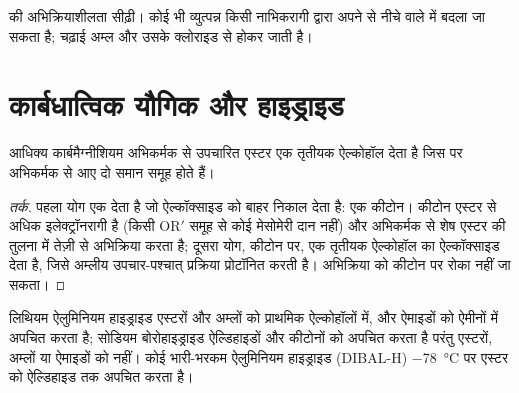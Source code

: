 \begin{omfigure}

{\small {} की अभिक्रियाशीलता सीढ़ी। कोई भी व्युत्पन्न किसी नाभिकरागी द्वारा
अपने से नीचे वाले में बदला जा सकता है; चढ़ाई अम्ल और उसके क्लोराइड से होकर जाती है।}
\end{omfigure}

\section{कार्बधात्विक यौगिक और हाइड्राइड}

\begin{proposition}[दो ग्रीन्यार योग]\label{prop:b2:acyl-substitution:grignard-ester}
आधिक्य कार्बमैग्नीशियम अभिकर्मक से उपचारित एस्टर एक तृतीयक ऐल्कोहॉल देता है जिस पर अभिकर्मक से आए
दो समान समूह होते हैं।
\end{proposition}

\begin{proof}[तर्क]
पहला योग एक  देता है जो ऐल्कॉक्साइड को बाहर निकाल देता है: एक कीटोन। कीटोन
एस्टर से अधिक इलेक्ट्रॉनरागी है (किसी $\mathrm{OR'}$ समूह से कोई मेसोमेरी दान नहीं) और अभिकर्मक से
शेष एस्टर की तुलना में तेज़ी से अभिक्रिया करता है; दूसरा योग, कीटोन पर, एक तृतीयक ऐल्कोहॉल का
ऐल्कॉक्साइड देता है, जिसे अम्लीय उपचार-पश्चात् प्रक्रिया प्रोटॉनित करती है। अभिक्रिया को कीटोन पर रोका नहीं जा सकता।
\end{proof}

\begin{proposition}[हाइड्राइड अपचयन]\label{prop:b2:acyl-substitution:hydrides}
लिथियम ऐलुमिनियम हाइड्राइड एस्टरों और अम्लों को प्राथमिक ऐल्कोहॉलों में, और ऐमाइडों को ऐमीनों में अपचित करता है;
सोडियम बोरोहाइड्राइड ऐल्डिहाइडों और कीटोनों को अपचित करता है परंतु एस्टरों, अम्लों या ऐमाइडों को नहीं। कोई भारी-भरकम ऐलुमिनियम
हाइड्राइड (DIBAL-H) \qty{-78}{\degreeCelsius} पर एस्टर को ऐल्डिहाइड तक अपचित करता है।
\end{proposition}

